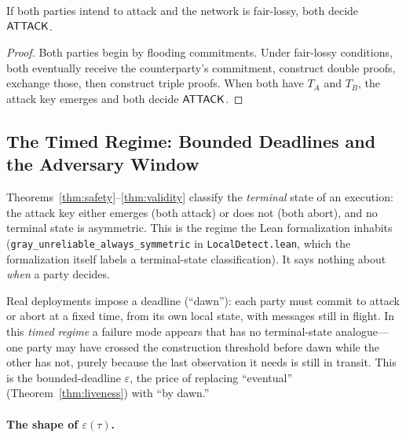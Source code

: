 \begin{theorem}[Validity]
\label{thm:validity}
If both parties intend to attack and the network is fair-lossy, both decide $\mathsf{ATTACK}$.
\end{theorem}

\begin{proof}
Both parties begin by flooding commitments. Under fair-lossy conditions, both eventually receive the counterparty's commitment, construct double proofs, exchange those, then construct triple proofs. When both have $T_A$ and $T_B$, the attack key emerges and both decide $\mathsf{ATTACK}$.
\end{proof}

\subsection{The Timed Regime: Bounded Deadlines and the Adversary Window}
\label{sec:timed-regime}

Theorems~\ref{thm:safety}--\ref{thm:validity} classify the \emph{terminal} state of an execution: the attack key either emerges (both attack) or does not (both abort), and no terminal state is asymmetric. This is the regime the Lean formalization inhabits (\texttt{gray\_unreliable\_always\_symmetric} in \texttt{LocalDetect.lean}, which the formalization itself labels a terminal-state classification). It says nothing about \emph{when} a party decides.

Real deployments impose a deadline (``dawn''): each party must commit to attack or abort at a fixed time, from its own local state, with messages still in flight. In this \emph{timed regime} a failure mode appears that has no terminal-state analogue---one party may have crossed the construction threshold before dawn while the other has not, purely because the last observation it needs is still in transit. This is the bounded-deadline $\varepsilon$, the price of replacing ``eventual'' (Theorem~\ref{thm:liveness}) with ``by dawn.''

\paragraph{The shape of $\varepsilon(\tau)$.}

